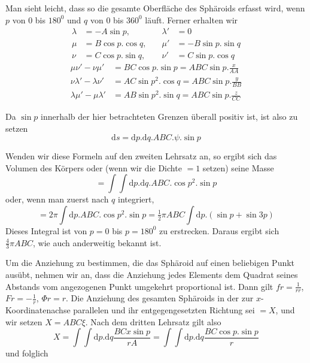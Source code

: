 \par
Man sieht leicht, dass so die gesamte Oberfläche des Sphäroids erfasst wird, wenn $p$ von $0$ bis $180^0$ und $q$ von $0$ bis $360^0$ läuft. Ferner erhalten wir
\[
\begin{aligned}
\lambda&=-A\sin p, &\quad\lambda'&=0\\
\mu&=B\cos p.\cos q, &\quad\mu'&=-B\sin p.\sin q\\
\nu&=C\cos p.\sin q, &\quad\nu'&=C\sin p.\cos q
\end{aligned}
\]
\[
\begin{aligned}
\mu\nu'-\nu\mu'&=BC\cos p.\sin p=ABC\sin p.\frac{x}{AA}\\
\nu\lambda'-\lambda\nu'&=AC\sin p^2.\cos q=ABC\sin p.\frac{y}{BB}\\
\lambda\mu'-\mu\lambda'&=AB\sin p^2.\sin q=ABC\sin p.\frac{z}{CC}
\end{aligned}
\]
\par
Da $\sin p$ innerhalb der hier betrachteten Grenzen überall positiv ist, ist also zu setzen
\[
\mathrm{d}s=\mathrm{d}p.\mathrm{d}q.ABC.\psi.\sin p
\]
\par
Wenden wir diese Formeln auf den zweiten Lehrsatz an, so ergibt sich das Volumen des Körpers oder (wenn wir die Dichte $=1$ setzen) seine Masse
\[
=\int\!\int\mathrm{d}p.\mathrm{d}q.ABC.\cos p^2.\sin p
\]
oder, wenn man zuerst nach $q$ integriert,
\[
=2\pi\int\mathrm{d}p.ABC.\cos p^2.\sin p=\tfrac12\pi ABC\int\mathrm{d}p.(\sin p+\sin3p)
\]
Dieses Integral ist von $p=0$ bis $p=180^0$ zu erstrecken. Daraus ergibt sich $\tfrac43\pi ABC$, wie auch anderweitig bekannt ist.

\par
Um die Anziehung zu bestimmen, die das Sphäroid auf einen beliebigen Punkt ausübt, nehmen wir an, dass die Anziehung jedes Elements dem Quadrat seines Abstands vom angezogenen Punkt umgekehrt proportional ist. Dann gilt $fr=\frac{1}{rr}$, $Fr=-\frac{1}{r}$, $\Phi r=r$. Die Anziehung des gesamten Sphäroids in der zur $x$-Koordinatenachse parallelen und ihr entgegengesetzten Richtung sei $=X$, und wir setzen $X=ABC\xi$. Nach dem dritten Lehrsatz gilt also
\[
X=\int\!\int\mathrm{d}p.\mathrm{d}q\frac{BCx\sin p}{rA}=\int\!\int\mathrm{d}p.\mathrm{d}q\frac{BC\cos p.\sin p}{r}
\]
und folglich
